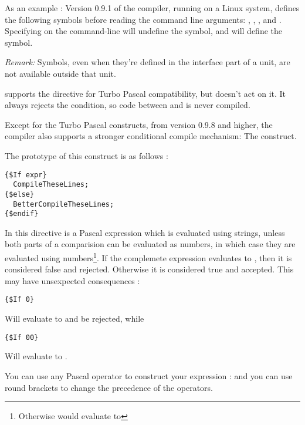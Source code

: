 \documentclass{report}
\begin{document}
As an example : Version 0.9.1 of the compiler, running on a Linux system,
defines the following symbols before reading the command line arguments:
, , ,  and .
Specifying  on the command-line will undefine the 
symbol, and will define the  symbol. 

{\em Remark: } Symbols, even when they're defined in the interface part of 
a unit, are not available outside that unit.

\fpc supports the  directive for Turbo Pascal
compatibility, but doesn't act on it. It always rejects the condition, so
code between  and  is never compiled.

Except for the Turbo Pascal constructs, from version 0.9.8 and higher,
the \fpc compiler also supports a stronger conditional compile mechanism:
The  construct. 

The prototype of this construct is as follows :
\begin{verbatim}
{$If expr}
  CompileTheseLines;
{$else}
  BetterCompileTheseLines;
{$endif}
\end{verbatim}
In this directive  is a Pascal expression which is evaluated using
strings, unless both parts of a comparision can be evaluated as numbers, 
in which case they are evaluated using numbers\footnote{Otherwise
 would evaluate to }.
If the complemete expression evaluates to , then it is considered 
false and rejected. Otherwise it is considered true and accepted. This may
have unsexpected consequences :
\begin{verbatim}
{$If 0}
\end{verbatim}
Will evaluate to  and be rejected, while
\begin{verbatim}
{$If 00}
\end{verbatim}
Will evaluate to .

You can use any Pascal operator to construct your expression :  and you can use round brackets to change the
precedence of the operators.
\end{document}
